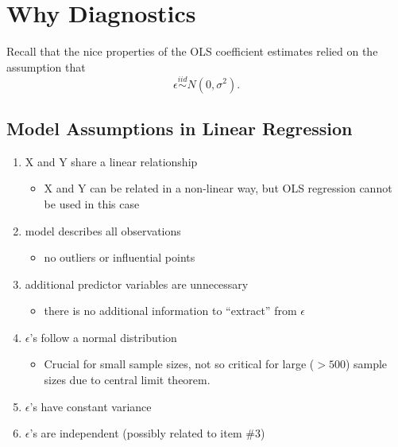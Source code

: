 \documentclass[12pt]{notes}
\begin{document}

\section{Why Diagnostics}

Recall that the nice properties of the OLS coefficient estimates relied on the assumption that \[\epsilon \stackrel{iid}{\sim} N(0, \sigma^2).\]


\begin{minipage}[l][3cm][c]{\textwidth}

\end{minipage}

\subsection*{Model Assumptions in Linear Regression}
\begin{enumerate}
\item X and Y share a linear relationship
\begin{itemize}
\item X and Y can be related in a non-linear way, but OLS regression cannot be used in this case
\end{itemize}
\item model describes all observations 
\begin{itemize}
\item no outliers or influential points
\end{itemize}
\item additional predictor variables are unnecessary
\begin{itemize}
\item there is no additional information to ``extract'' from $\epsilon$
\end{itemize}
\item $\epsilon$'s follow a normal distribution
\begin{itemize}
\item Crucial for small sample sizes, not so critical for large ($> 500$) sample sizes due to central limit theorem. 
\end{itemize}
\item $\epsilon$'s have constant variance
\item $\epsilon$'s are independent (possibly related to item \#3)
\end{enumerate}
\end{document}
